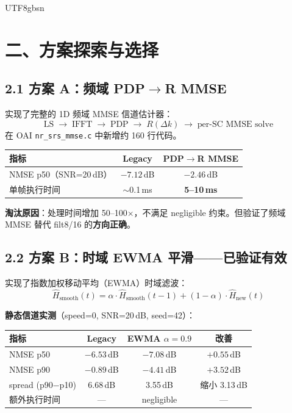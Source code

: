 \documentclass[11pt,a4paper]{article}
\begin{document}
\begin{CJK}{UTF8}{gbsn}
\section{二、方案探索与选择}

\subsection{2.1 方案 A：频域 PDP$\to$R MMSE}

实现了完整的 1D 频域 MMSE 信道估计器：
\[
\text{LS} \;\to\; \text{IFFT} \;\to\; \text{PDP} \;\to\; R(\Delta k) \;\to\; \text{per-SC MMSE solve}
\]
在 OAI \texttt{nr\_srs\_mmse.c} 中新增约 160 行代码。

\begin{table}[h]\centering
\begin{tabular}{lcc}
\toprule
指标 & Legacy & PDP$\to$R MMSE \\
\midrule
NMSE p50（SNR=20\,dB） & $-7.12$\,dB & $-2.46$\,dB \\
单帧执行时间 & $\sim$0.1\,ms & \textbf{5--10\,ms} \\
\bottomrule
\end{tabular}
\end{table}

\textbf{淘汰原因}：处理时间增加 50--100$\times$，不满足 negligible 约束。但验证了频域 MMSE 替代 filt8/16 的\textbf{方向正确}。

\subsection{2.2 方案 B：时域 EWMA 平滑——已验证有效}

实现了指数加权移动平均（EWMA）时域滤波：
\[
\hat{H}_{\text{smooth}}(t) = \alpha \cdot \hat{H}_{\text{smooth}}(t\!-\!1) + (1\!-\!\alpha) \cdot \hat{H}_{\text{new}}(t)
\]

\textbf{静态信道实测}（speed=0, SNR=20\,dB, seed=42）：

\begin{table}[h]\centering
\begin{tabular}{lccc}
\toprule
指标 & Legacy & EWMA $\alpha=0.9$ & 改善 \\
\midrule
NMSE p50 & $-6.53$\,dB & $\mathbf{-7.08}$\,dB & $+0.55$\,dB \\
NMSE p90 & $-0.89$\,dB & $\mathbf{-4.41}$\,dB & $+3.52$\,dB \\
spread (p90$-$p10) & 6.68\,dB & 3.55\,dB & 缩小 3.13\,dB \\
额外执行时间 & --- & negligible & --- \\
\bottomrule
\end{tabular}
\end{table}


\end{CJK}
\end{document}
